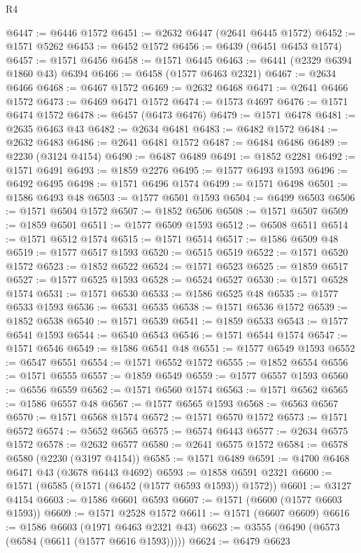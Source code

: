 \begin{lexlean}{R4}
\begin{coremodule}
@6447 := @6446 @1572
@6451 := @2632 @6447 (@2641 @6445 @1572)
@6452 := @1571 @5262
@6453 := @6452 @1572
@6456 := @6439 (@6451 @6453 @1574)
@6457 := @1571 @6456
@6458 := @1571 @6445
@6463 := @6441 (@2329 @6394 @1860 @43) @6394
@6466 := @6458 (@1577 @6463 @2321)
@6467 := @2634 @6466
@6468 := @6467 @1572
@6469 := @2632 @6468
@6471 := @2641 @6466 @1572
@6473 := @6469 @6471 @1572
@6474 := @1573 @4697
@6476 := @1571 @6474 @1572
@6478 := @6457 (@6473 @6476)
@6479 := @1571 @6478
@6481 := @2635 @6463 @43
@6482 := @2634 @6481
@6483 := @6482 @1572
@6484 := @2632 @6483
@6486 := @2641 @6481 @1572
@6487 := @6484 @6486
@6489 := @2230 (@3124 @4154)
@6490 := @6487 @6489
@6491 := @1852 @2281
@6492 := @1571 @6491
@6493 := @1859 @2276
@6495 := @1577 @6493 @1593
@6496 := @6492 @6495
@6498 := @1571 @6496 @1574
@6499 := @1571 @6498
@6501 := @1586 @6493 @48
@6503 := @1577 @6501 @1593
@6504 := @6499 @6503
@6506 := @1571 @6504 @1572
@6507 := @1852 @6506
@6508 := @1571 @6507
@6509 := @1859 @6501
@6511 := @1577 @6509 @1593
@6512 := @6508 @6511
@6514 := @1571 @6512 @1574
@6515 := @1571 @6514
@6517 := @1586 @6509 @48
@6519 := @1577 @6517 @1593
@6520 := @6515 @6519
@6522 := @1571 @6520 @1572
@6523 := @1852 @6522
@6524 := @1571 @6523
@6525 := @1859 @6517
@6527 := @1577 @6525 @1593
@6528 := @6524 @6527
@6530 := @1571 @6528 @1574
@6531 := @1571 @6530
@6533 := @1586 @6525 @48
@6535 := @1577 @6533 @1593
@6536 := @6531 @6535
@6538 := @1571 @6536 @1572
@6539 := @1852 @6538
@6540 := @1571 @6539
@6541 := @1859 @6533
@6543 := @1577 @6541 @1593
@6544 := @6540 @6543
@6546 := @1571 @6544 @1574
@6547 := @1571 @6546
@6549 := @1586 @6541 @48
@6551 := @1577 @6549 @1593
@6552 := @6547 @6551
@6554 := @1571 @6552 @1572
@6555 := @1852 @6554
@6556 := @1571 @6555
@6557 := @1859 @6549
@6559 := @1577 @6557 @1593
@6560 := @6556 @6559
@6562 := @1571 @6560 @1574
@6563 := @1571 @6562
@6565 := @1586 @6557 @48
@6567 := @1577 @6565 @1593
@6568 := @6563 @6567
@6570 := @1571 @6568 @1574
@6572 := @1571 @6570 @1572
@6573 := @1571 @6572
@6574 := @5652 @6565
@6575 := @6574 @6443
@6577 := @2634 @6575 @1572
@6578 := @2632 @6577
@6580 := @2641 @6575 @1572
@6584 := @6578 @6580 (@2230 (@3197 @4154))
@6585 := @1571 @6489
@6591 := @4700 @6468 @6471 @43 (@3678 @6443 @4692)
@6593 := @1858 @6591 @2321
@6600 := @1571 (@6585 (@1571 (@6452 (@1577 @6593 @1593)) @1572))
@6601 := @3127 @4154
@6603 := @1586 @6601 @6593
@6607 := @1571 (@6600 (@1577 @6603 @1593))
@6609 := @1571 @2528 @1572
@6611 := @1571 (@6607 @6609)
@6616 := @1586 @6603 (@1971 @6463 @2321 @43)
@6623 := @3555 (@6490 (@6573 (@6584 (@6611 (@1577 @6616 @1593)))))
@6624 := @6479 @6623

\end{coremodule}
\end{lexlean}
